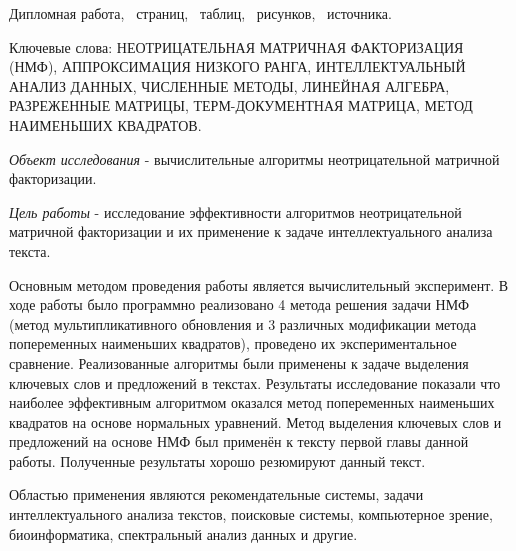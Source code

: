 Дипломная работа, \npages\ страниц, \ntables\ таблиц, \nris\ рисунков, \ncite\ источника.

Ключевые слова:
НЕОТРИЦАТЕЛЬНАЯ МАТРИЧНАЯ ФАКТОРИЗАЦИЯ (НМФ),
АППРОКСИМАЦИЯ НИЗКОГО РАНГА,
ИНТЕЛЛЕКТУАЛЬНЫЙ АНАЛИЗ ДАННЫХ,
ЧИСЛЕННЫЕ МЕТОДЫ, ЛИНЕЙНАЯ АЛГЕБРА,
РАЗРЕЖЕННЫЕ МАТРИЦЫ,
ТЕРМ-ДОКУМЕНТНАЯ МАТРИЦА,
МЕТОД НАИМЕНЬШИХ КВАДРАТОВ.

\textit{Объект исследования} - вычислительные алгоритмы неотрицательной матричной факторизации.


\textit{Цель работы} - исследование эффективности алгоритмов неотрицательной матричной факторизации и их применение к задаче интеллектуального анализа текста.

Основным методом проведения работы является вычислительный эксперимент. В ходе работы было программно реализовано 4 метода решения задачи НМФ
(метод мультипликативного обновления и 3 различных модификации метода попеременных наименьших квадратов), проведено их экспериментальное сравнение.
Реализованные алгоритмы были применены к задаче выделения ключевых слов и предложений в текстах.
Результаты исследование показали что наиболее эффективным алгоритмом оказался метод попеременных наименьших квадратов на основе нормальных уравнений.
Метод выделения ключевых слов и предложений на основе НМФ был применён к тексту первой главы данной работы.
Полученные результаты хорошо резюмируют данный текст.

Областью применения являются рекомендательные системы, задачи интеллектуального анализа текстов, поисковые системы, компьютерное зрение,
биоинформатика, спектральный анализ данных и другие.


\newpage






